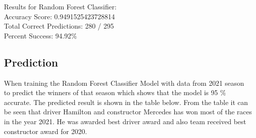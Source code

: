 \documentclass[11pt,article,oneside]{article}
\begin{document}
Results for Random Forest Classifier:\\
Accuracy Score: 0.9491525423728814\\
Total Correct Predictions: 280 / 295\\
Percent Success: 94.92\%\\

\subsection{Prediction}   
When training the Random Forest Classifier Model with data from 2021 season to predict the winners of that season which shows that the model is 95 \% accurate. The predicted result is shown in the table below. From the table it can be seen that driver Hamilton and constructor Mercedes has won most of the races in the year 2021. 
He was awarded best driver award and also team received best constructor award for 2020.
\end{document}
